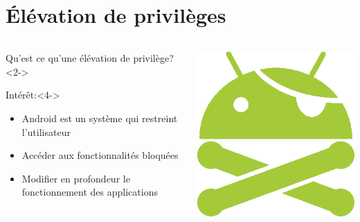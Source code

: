 \documentclass[aspectratio=1610, ]{beamer}%
\begin{document}
\section{Élévation de privilèges}
  \begin{frame}
    \slidetitle[]
    \noindent
    \begin{columns}
      \begin{column}{0.7\linewidth}
        \begin{block}{Qu'est ce qu'une élévation de privilège?}<2->
        \end{block}
        \begin{block}{Intérêt:}<4->
          \begin{itemize}
            \item<5-> Android est un système qui restreint l'utilisateur
            \item<6-> Accéder aux fonctionnalités bloquées
            \item<7-> Modifier en profondeur le fonctionnement des applications
          \end{itemize}
        \end{block}
      \end{column}
      \begin{column}{0.25\linewidth}
        \includegraphics[width=1\linewidth]{android_root.png}
      \end{column}
    \end{columns}
  \end{frame}
\end{document}
